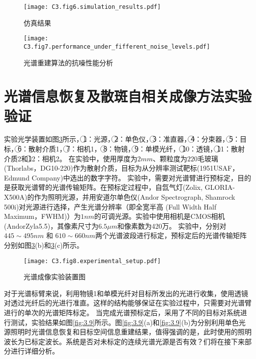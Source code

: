 \begin{figure}[htp]
	\centering
	\texttt{[image: C3.fig6.simulation\_results.pdf]}
	\caption{仿真结果}
	\label{fig:3.6}
\end{figure}

\begin{figure}[htp]
	\centering
	\texttt{[image: C3.fig7.performance\_under\_fifferent\_noise\_levels.pdf]}
	\caption{光谱重建算法的抗噪性能分析}
	\label{fig:3.7}
\end{figure}

\section{光谱信息恢复及散斑自相关成像方法实验验证}

实验光学装置如图\ref{fig:3.8}所示，{\large \textcircled{\normalsize 1}}：光源，{\large \textcircled{\normalsize 2}}：单色仪，{\large \textcircled{\normalsize 3}}：准直器，{\large \textcircled{\normalsize 4}}：分束器，{\large \textcircled{\normalsize 5}}：目标，{\large \textcircled{\normalsize 6}}：散射介质1，{\large \textcircled{\normalsize 7}}：相机1，
{\large \textcircled{\normalsize 8}}：物镜，{\large \textcircled{\normalsize 9}}：单模光纤，
{\large \textcircled{\normalsize 10}}：透镜，{\large \textcircled{\normalsize 11}}：散射介质2和{\large \textcircled{\normalsize 12}}：相机2。
在实验中，使用厚度为$2mm$、颗粒度为$220$毛玻璃(Thorlabs，DG10-220)作为散射介质，目标为从分辨率测试靶标(1951USAF，Edmund Company)中选出的数字字符。
实验中，需要对光谱臂进行预标定，目的是获取光谱臂的光谱传输矩阵。在预标定过程中，自氙气灯(Zolix, GLORIA-X500A)的作为照明光源，并用安道尔单色仪(Andor Spectrograph, Shamrock 500i)对光源进行选择，产生光谱分辨率（即全宽半高
(Full Width Half Maximum，FWHM)）为$1 nm$的可调光源。实验中使用相机是CMOS相机(AndorZyla5.5)，其像素尺寸为$6.5\mu m$和像素数为420万。
实验中，分别对$445 \sim 495nm$ 和 $610 \sim 660nm$两个光谱波段进行标定，预标定后的光谱传输矩阵分别如图\ref{fig:3.8}(b)和\ref{fig:3.8}(c)所示。

\begin{figure}[htp]
	\centering
	\texttt{[image: C3.fig8.experimental\_setup.pdf]}
	\caption{光谱成像实验装置图}
	\label{fig:3.8}
\end{figure}

对于光谱标臂来说，利用物镜1和单模光纤对目标所发出的光进行收集，使用透镜对透过光纤后的光进行准直。这样的结构能够保证在实验过程中，只需要对光谱臂进行的单次的光谱矩阵标定。
当完成光谱预标定后，采用了不同的目标对系统进行测试，实验结果如图\ref{fig:3.9}所示。图\ref{fig:3.9}(a)和\ref{fig:3.9}(b)为分别利用单色光源照明时光谱信息恢复和目标空间信息重建结果，值得强调的是，此时使用的照明波长为已标定波长。系统是否对未标定的连续光谱光源是否有效？们将在接下来部分进行详细分析。

